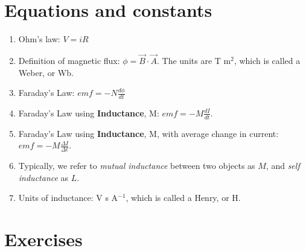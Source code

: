\documentclass[10pt]{article}
\begin{document}
\maketitle

\section{Equations and constants}

\begin{enumerate}
\item Ohm's law: $V=iR$
\item Definition of magnetic flux: $\phi = \vec{B} \cdot \vec{A}$.  The units are T m$^2$, which is called a Weber, or Wb.
\item Faraday's Law: $emf = -N \frac{d\phi}{dt}$
\item Faraday's Law using \textbf{Inductance}, M: $emf = -M \frac{dI}{dt}$.
\item Faraday's Law using \textbf{Inductance}, M, with average change in current: $emf = -M \frac{\Delta I}{\Delta t}$.
\item Typically, we refer to \textit{mutual inductance} between two objects as $M$, and \textit{self inductance} as $L$.
\item Units of inductance: V s A$^{-1}$, which is called a Henry, or H.
\end{enumerate}

\section{Exercises}
\end{document}
